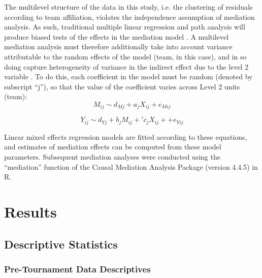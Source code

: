The multilevel structure of the data in this study, i.e. the clustering of residuals according to team affiliation, violates the independence assumption of mediation analysis. As such, traditional multiple linear regression and path analysis will produce biased tests of the effects in the mediation model \citep{Raudenbush2002}.
A multilevel mediation analysis must therefore additionally take into account variance attributable to the random effects of the model (team, in this case), and in so doing capture heterogeneity of variance in the indirect effect due to the level 2 variable \citep{Tofighi2014}.  To do this, each coefficient in the model must be random (denoted by subscript ``j''), so that the value of the coefficient varies across Level 2 units (team): \\

\begin{equation}
  M_{ij} \sim d_{Mj} + a_jX_{ij} + e_{Mij}
\end{equation}

\begin{equation}
  Y_{ij} \sim d_{Yj} + b_jM_{ij} + 'c_jX_{ij} +  + e_{Yij}
\end{equation}
\bigskip

Linear mixed effects regression models are fitted according to these equations, and estimates of mediation effects can be computed from these model parameters.  Subsequent mediation analyses were conducted using the ``mediation'' function of the Causal Mediation Analysis Package (version 4.4.5) in R.









\section{Results\label{app8:results}}



\subsection{Descriptive Statistics}

\subsubsection{Pre-Tournament Data Descriptives \label{app8:descriptivesPre}}

